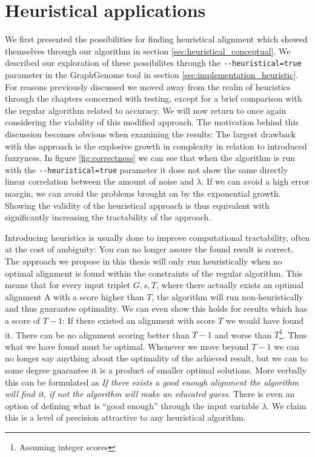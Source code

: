\documentclass[thesis.tex]{subfiles}
\begin{document}
\section{Heuristical applications}
\label{sec:heuristical_applications}
We first presented the possibilities for finding heuristical alignment which showed themselves through our algorithm in section \ref{sec:heuristical_conceptual}. We described our exploration of these possibilites through the \texttt{-{}-heuristical=true} parameter in the GraphGenome tool in section \ref{sec:implementation_heuristic}. For reasons previously discussed we moved away from the realm of heuristics through the chapters concerned with testing, except for a brief comparison with the regular algorithm related to accuracy. We will now return to once again considering the viability of this modified approach. The motivation behind this discussion becomes obvious when examining the results: The largest drawback with the approach is the explosive growth in complexity in relation to introduced fuzzyness. In figure \ref{fig:correctness} we can see that when the algorithm is run with the \texttt{-{}-heuristical=true} parameter it does not show the same directly linear correlation between the amount of noise and $\lambda$. If we can avoid a high error margin, we can avoid the problems brought on by the exponential growth. Showing the validity of the heuristical approach is thus equivalent with significantly increasing the tractability of the approach.\\
\par\noindent
Introducing heuristics is usually done to improve computational tractability, often at the cost of ambiguity: You can no longer assure the found result is correct. The approach we propose in this thesis will only run heuristically when no optimal alignment is found within the constraints of the regular algorithm. This means that for every input triplet ${G, s, T}$, where there actually exists an optimal alignment A with a score higher than $T$, the algorithm will run non-heuristically and thus guarantee optimality. We can even show this holds for results which has a score of $T-1$: If there existed an alignment with score $T$ we would have found it. There can be no alignment scoring better than $T-1$ and worse than $T$\footnote{Assuming integer scores}. Thus what we have found must be optimal. Whenever we move beyond $T-1$ we can no longer say anything about the optimality of the achieved result, but we can to some degree guarantee it is a product of smaller optimal solutions. More verbally this can be formulated as \textit{If there exists a good enough alignment the algorithm will find it, if not the algorithm will make an educated guess}. There is even an option of defining what is ``good enough'' through the input variable $\lambda$. We claim this is a level of precision attractive to any heuristical algorithm.
\end{document}
